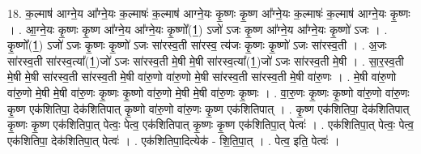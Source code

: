 \documentclass[17pt]{extarticle}
\begin{document}
18. क॒ल्माष॑ आग्ने॒य आ᳚ग्ने॒यः क॒ल्माषः॑ क॒ल्माष॑ आग्ने॒यः कृ॒ष्णः कृ॒ष्ण आ᳚ग्ने॒यः क॒ल्माषः॑ क॒ल्माष॑ आग्ने॒यः कृ॒ष्णः । . आ॒ग्ने॒यः कृ॒ष्णः कृ॒ष्ण आ᳚ग्ने॒य आ᳚ग्ने॒यः कृ॒ष्णो᳚(1॒) ऽजो॑ ऽजः कृ॒ष्ण आ᳚ग्ने॒य आ᳚ग्ने॒यः कृ॒ष्णो॑ ऽजः । . कृ॒ष्णो᳚(1॒) ऽजो॑ ऽजः कृ॒ष्णः कृ॒ष्णो॑ ऽजः सा॑रस्व॒ती सा॑रस्व॒ त्य॑जः कृ॒ष्णः कृ॒ष्णो॑ ऽजः सा॑रस्व॒ती । . अ॒जः सा॑रस्व॒ती सा॑रस्व॒त्या᳚(1॒)जो॑ ऽजः सा॑रस्व॒ती मे॒षी मे॒षी सा॑रस्व॒त्या᳚(1॒)जो॑ ऽजः सा॑रस्व॒ती मे॒षी । . सा॒र॒स्व॒ती मे॒षी मे॒षी सा॑रस्व॒ती सा॑रस्व॒ती मे॒षी वा॑रु॒णो वा॑रु॒णो मे॒षी सा॑रस्व॒ती सा॑रस्व॒ती मे॒षी वा॑रु॒णः । . मे॒षी वा॑रु॒णो वा॑रु॒णो मे॒षी मे॒षी वा॑रु॒णः कृ॒ष्णः कृ॒ष्णो वा॑रु॒णो मे॒षी मे॒षी वा॑रु॒णः कृ॒ष्णः । . वा॒रु॒णः कृ॒ष्णः कृ॒ष्णो वा॑रु॒णो वा॑रु॒णः कृ॒ष्ण एक॑शितिपा॒ देक॑शितिपात् कृ॒ष्णो वा॑रु॒णो वा॑रु॒णः कृ॒ष्ण एक॑शितिपात् । . कृ॒ष्ण एक॑शितिपा॒ देक॑शितिपात् कृ॒ष्णः कृ॒ष्ण एक॑शितिपा॒त् पेत्वः॒ पेत्व॒ एक॑शितिपात् कृ॒ष्णः कृ॒ष्ण एक॑शितिपा॒त् पेत्वः॑ । . एक॑शितिपा॒त् पेत्वः॒ पेत्व॒ एक॑शितिपा॒ देक॑शितिपा॒त् पेत्वः॑ । . एक॑शितिपा॒दित्येक॑ - शि॒ति॒पा॒त् । . पेत्व॒ इति॒ पेत्वः॑ । \newline
\pagebreak
\end{document}
